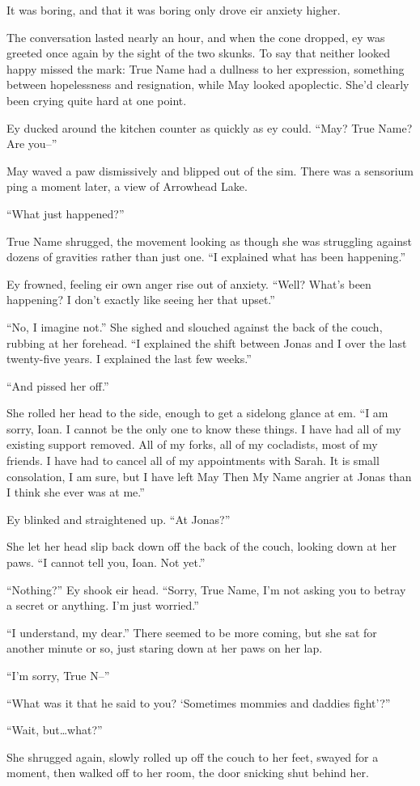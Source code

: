 It was boring, and that it was boring only drove eir anxiety higher.

The conversation lasted nearly an hour, and when the cone dropped, ey was greeted once again by the sight of the two skunks. To say that neither looked happy missed the mark: True Name had a dullness to her expression, something between hopelessness and resignation, while May looked apoplectic. She'd clearly been crying quite hard at one point.

Ey ducked around the kitchen counter as quickly as ey could. ``May? True Name? Are you--''

May waved a paw dismissively and blipped out of the sim. There was a sensorium ping a moment later, a view of Arrowhead Lake.

``What just happened?''

True Name shrugged, the movement looking as though she was struggling against dozens of gravities rather than just one. ``I explained what has been happening.''

Ey frowned, feeling eir own anger rise out of anxiety. ``Well? What's been happening? I don't exactly like seeing her that upset.''

``No, I imagine not.'' She sighed and slouched against the back of the couch, rubbing at her forehead. ``I explained the shift between Jonas and I over the last twenty-five years. I explained the last few weeks.''

``And pissed her off.''

She rolled her head to the side, enough to get a sidelong glance at em. ``I am sorry, Ioan. I cannot be the only one to know these things. I have had all of my existing support removed. All of my forks, all of my cocladists, most of my friends. I have had to cancel all of my appointments with Sarah. It is small consolation, I am sure, but I have left May Then My Name angrier at Jonas than I think she ever was at me.''

Ey blinked and straightened up. ``At Jonas?''

She let her head slip back down off the back of the couch, looking down at her paws. ``I cannot tell you, Ioan. Not yet.''

``Nothing?'' Ey shook eir head. ``Sorry, True Name, I'm not asking you to betray a secret or anything. I'm just worried.''

``I understand, my dear.'' There seemed to be more coming, but she sat for another minute or so, just staring down at her paws on her lap.

``I'm sorry, True N--''

``What was it that he said to you? `Sometimes mommies and daddies fight'?''

``Wait, but\ldots what?''

She shrugged again, slowly rolled up off the couch to her feet, swayed for a moment, then walked off to her room, the door snicking shut behind her.
